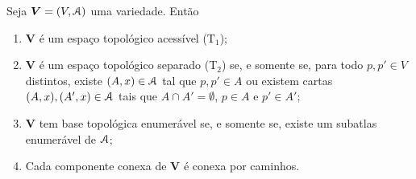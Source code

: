 \begin{proposition}
Seja $\bm V = (V,\mathcal{A})$ uma variedade. Então
	\begin{enumerate}
	\item $\bm V$ é um espaço topológico acessível (T$_1$);
	
	\item $\bm V$ é um espaço topológico separado (T$_2$) se, e somente se, para todo $p,p' \in V$ distintos, existe $(A,x) \in \mathcal{A}$ tal que $p,p' \in A$ ou existem cartas $(A,x), (A',x) \in \mathcal{A}$ tais que $A \cap A' = \emptyset$, $p \in A$ e $p' \in A'$;
	
	\item $\bm V$ tem base topológica enumerável se, e somente se, existe um subatlas enumerável de $\mathcal{A}$;
	
	\item Cada componente conexa de $\bm V$ é conexa por caminhos.
	\end{enumerate}
\end{proposition}
